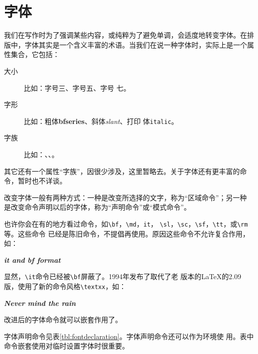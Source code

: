 \section{字体}

我们在写作时为了强调某些内容，或纯粹为了避免单调，会适度地转变字体。在排
版中，字体其实是一个含义丰富的术语。当我们在说一种字体时，实际上是一个属
性集合，它包括：

\begin{codeout}
  \begin{description}
  \item[大小] 比如：{字号三}、{字号五}、{字号
      七}。
  \item[字形] 比如：粗体{\textbf{bfseries}}、斜体{\textsl{slant}}、打印
    体{\texttt{italic}}。
  \item[字族] 比如：、、。
  \end{description}
\end{codeout}

其它还有一个属性“字族”，因很少涉及，这里暂略去。关于字体还有更丰富的命
令，暂时也不详谈。

改变字体一般有两种方式：一种是改变所选择的文字，称为“区域命令”；另一种
是改变命令声明以后的字体，称为“声明命令”或“模式命令”。

也许你会在有的地方看过命令，如\verb!\bf!，\verb!\md!，\verb!it!，
\verb!\sl!，\verb!\sc!，\verb!\sf!，\verb!\tt!，或\verb!\rm!等。这些命令
已经是陈旧命令，不提倡再使用。原因这些命令不允许复合作用，如：

\begin{codeout}
  \it{\bf{ it and bf format}}
\end{codeout}

显然，\verb!\it!命令已经被\verb!\bf!屏蔽了。1994年发布了\LaTeXe{}取代了老
版本的\LaTeX{}的2.09版，使用了新的命令风格\verb!\textxx!，如：

\begin{codeout}
  \textit{\textbf{Never mind the rain}}
\end{codeout}

改进后的字体命令就可以嵌套作用了。

字体声明命令见表\ref{tbl:fontdeclaration}。字体声明命令还可以作为环境使
用。表中命令嵌套使用对临时设置字体时很重要。

